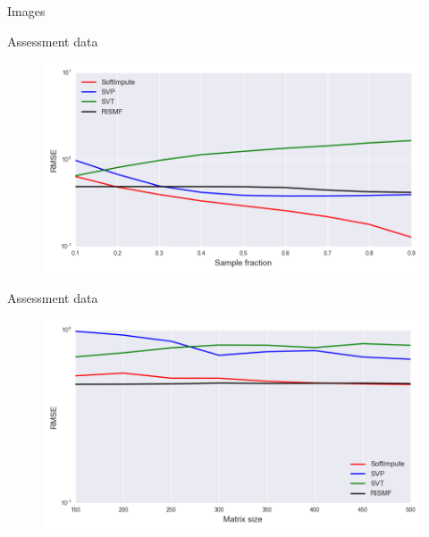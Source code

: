 \documentclass{beamer}
\begin{document}
\begin{frame}{Images}
\begin{multicols}{3}
\begin{figure}[h]
		\end{figure}
	\end{multicols}
	
\end{frame}
\begin{frame}{Assessment data}
	\begin{figure}[h]
		\centering
		\includegraphics[width=0.8\linewidth]{./../results/real/exper_1/real_nsamp_rmse.png}
	\end{figure}
\end{frame}
\begin{frame}{Assessment data}
	\begin{figure}[h]
		\centering
		\includegraphics[width=0.8\linewidth]{./../results/real/exper_3/real_size_rmse.png}
	\end{figure}
\end{frame}
\end{document}
